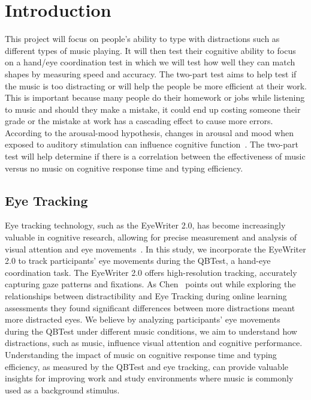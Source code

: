 \documentclass[manuscript, screen, review]{acmart} %
\begin{document}
\section{Introduction}
This project will focus on people's ability to type with distractions such as different types of music playing. 
It will then test their cognitive ability to focus on a hand/eye coordination test in which we will test how well they can match shapes by measuring speed and accuracy. 
The two-part test aims to help test if the music is too distracting or will help the people be more efficient at their work. 
This is important because many people do their homework or jobs while listening to music and should they make a mistake, it could end up costing someone their grade or the mistake at work has a cascading effect to cause more errors. 
According to the arousal-mood hypothesis, changes in arousal and mood when exposed to auditory stimulation can influence cognitive function~\cite{Chee}.
The two-part test will help determine if there is a correlation between the effectiveness of music versus no music on cognitive response time and typing efficiency. 

\subsection{Eye Tracking}
Eye tracking technology, such as the EyeWriter 2.0, has become increasingly valuable in cognitive research, allowing for precise measurement and analysis of visual attention and eye movements~\cite{Rana8642988}. 
In this study, we incorporate the EyeWriter 2.0 to track participants' eye movements during the QBTest, a hand-eye coordination task.
The EyeWriter 2.0 offers high-resolution tracking, accurately capturing gaze patterns and fixations.
As Chen~\cite{Chen23876} points out while exploring the relationships between distractibility and Eye Tracking during online learning assessments they found significant differences between more distractions meant more distracted eyes. We believe by analyzing participants' eye movements during the QBTest under different music conditions, we aim to understand how distractions, such as music, influence visual attention and cognitive performance.
Understanding the impact of music on cognitive response time and typing efficiency, as measured by the QBTest and eye tracking, can provide valuable insights for improving work and study environments where music is commonly used as a background stimulus.
\end{document}

